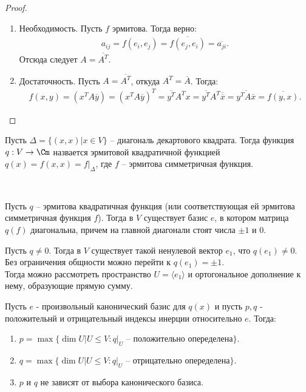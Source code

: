 \begin{proof}~
    \begin{enumerate}
        \item Необходимость. Пусть $f$ эрмитова. Тогда верно: \begin{gather*}
            a_{ij} = f(e_i, e_j) = \overline{f(e_j, e_i)} = \overline{a_{ji}}.
        \end{gather*} Отсюда следует $A = \overline{A^T}$.
        \item Достаточность. Пусть $A = \overline{A^T}$, откуда $A^T = \overline{A}$.
        Тогда: 
        \begin{gather*}
            f(x, y) = (x^T A \overline{y}) = (x^T A \overline{y})^T = \overline{y^T} A^T x = 
            \overline{y^T} A^T \overline{\overline{x}} = \overline{y^T A \overline{x}} = \overline{f(y, x)}.
        \end{gather*}
    \end{enumerate}
\end{proof}

\begin{definition}
    Пусть $\Delta = \{(x, x) \vert x \in V\}$ -- диагональ декартового квадрата. Тогда функция $q: V \to \Cm$ 
    назвается эрмитовой квадратичной функцией $q(x) = f(x, x) = f \vert_{\Delta}$, где $f$ -- эрмитова 
    симметричная функция.
\end{definition}

\begin{theorem}~

    Пусть $q$ -- эрмитова квадратичная функция (или соответствующая ей эрмитова симметричная функция $f$).
    Тогда в $V$ существует базис $e$, в котором матрица $q(f)$ диагональна, причем на главной диагонали 
    стоят числа $\pm 1$ и $0$.
\end{theorem}

\begin{idea}
    Пусть $q \neq 0$. Тогда в $V$ существует такой ненулевой вектор $e_1$, что $q(e_1) \neq 0$.
    Без ограничения общности можно перейти к $q(e_1) = \pm 1$. \\ Тогда можно рассмотреть пространство 
    $U = \langle e_1 \rangle$ и ортогональное дополнение к нему, образующие прямую сумму.
\end{idea}

\begin{proposition}
    Пусть $e$ - произвольный канонический базис для $q(x)$ и пусть $p, q$ - положительнй и отрицательный
    индексы инерции относительно $e$. Тогда:
    \begin{enumerate}
        \item $p = \max \{\dim U | U \leq V: q \vert_{U} \text{ -- положительно опеределена}\}$.
        \item $q = \max \{\dim U | U \leq V: q \vert_{U} \text{ -- отрицательно опеределена}\}$.
        \item $p$ и $q$ не зависят от выбора канонического базиса.
    \end{enumerate}
\end{proposition}

